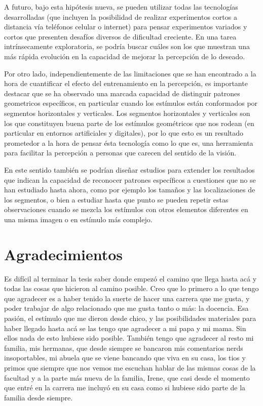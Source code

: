 \documentclass{article}
\numberwithin{figure}{section}
\begin{document}
    A futuro, bajo esta hipótesis nueva, se pueden utilizar todas las tecnologías desarrolladas (que incluyen la posibilidad de realizar experimentos cortos a distancia vía teléfonos celular o internet) para pensar experimentos variados y cortos que presenten desafíos diversos de dificultad creciente. En una tarea intrínsecamente exploratoria, se podría buscar cuáles son los que muestran una más rápida evolución en la capacidad de mejorar la percepción de lo deseado. 
    
    Por otro lado, independientemente de las limitaciones que se han encontrado a la hora de cuantificar el efecto del entrenamiento en la percepción, es importante destacar que se ha observado una marcada capacidad de distinguir patrones geometricos específicos, en particular cuando los estímulos están conformados por segmentos horizontales y verticales. Los segmentos horizontales y verticales son los que constituyen buena parte de los estímulos geométricos que nos rodean (en particular en entornos artificiales y digitales), por lo que esto es un resultado prometedor a la hora de pensar ésta tecnología como lo que es, una herramienta para facilitar la percepción a personas que carecen del sentido de la visión. 
    
    En este sentido también se podrían diseñar estudios para extender los resultados que indican la capacidad de reconocer patrones específicos a cuestiones que no se han estudiado hasta ahora, como por ejemplo los tamaños y las localizaciones de los segmentos, o bien a estudiar hasta que punto se pueden repetir estas observaciones cuando se mezcla los estímulos con otros elementos diferentes en una misma imagen o en estímulo más complejo. 
    
        
\clearpage
    
    
\section{Agradecimientos}    

    Es difícil al terminar la tesis saber donde empezó el camino que llega hasta acá y todas las cosas que hicieron al camino posible. Creo que lo primero a lo que tengo que agradecer es a haber tenido la suerte de hacer una carrera que me gusta, y poder trabajar de algo relacionado que me gusta tanto o más: la docencia. Esa pasión, el estímulo que me dieron desde chico, y las posibilidades materiales para haber llegado hasta acá se las tengo que agradecer a mi papa y mi mama. Sin ellos nada de esto hubiese sido posible. También tengo que agradecer al resto mi familia, mis hermanas, que desde siempre se bancaron mis comentarios nerds insoportables, mi abuela que se viene bancando que viva en su casa, los tios y primos que siempre que nos vemos me escuchan hablar de las mismas cosas de la facultad y a la parte más nueva de la familia, Irene, que casi desde el momento que entré en la carrera me incluyó en su casa como si hubiese sido parte de la familia desde siempre. 
    
\end{document}
